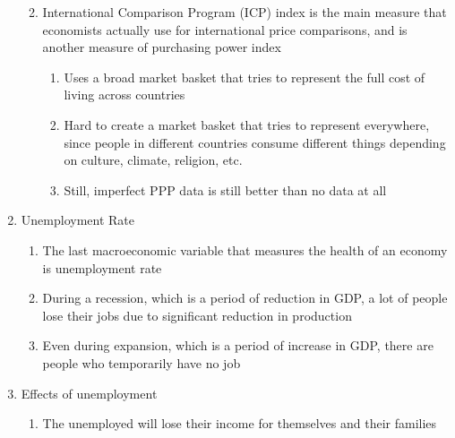 \documentclass[12pt]{article}
\begin{document}
\begin{enumerate}
\begin{enumerate}
\begin{enumerate}
            \end{enumerate}

          \item International Comparison Program (ICP) index is the main measure that economists actually use for international price comparisons, and is another measure of purchasing power index

            \begin{enumerate}

              \item Uses a broad market basket that tries to represent the full cost of living across countries

              \item Hard to create a market basket that tries to represent everywhere, since people in different countries consume different things depending on culture, climate, religion, etc.

              \item Still, imperfect PPP data is still better than no data at all

            \end{enumerate}

        \end{enumerate}

      \item Unemployment Rate

        \begin{enumerate}

          \item The last macroeconomic variable that measures the health of an economy is unemployment rate

          \item During a recession, which is a period of reduction in GDP, a lot of people lose their jobs due to significant reduction in production

          \item Even during expansion, which is a period of increase in GDP, there are people who temporarily have no job

        \end{enumerate}

      \item Effects of unemployment

        \begin{enumerate}

          \item The unemployed will lose their income for themselves and their families


\end{enumerate}
\end{enumerate}
\end{document}
